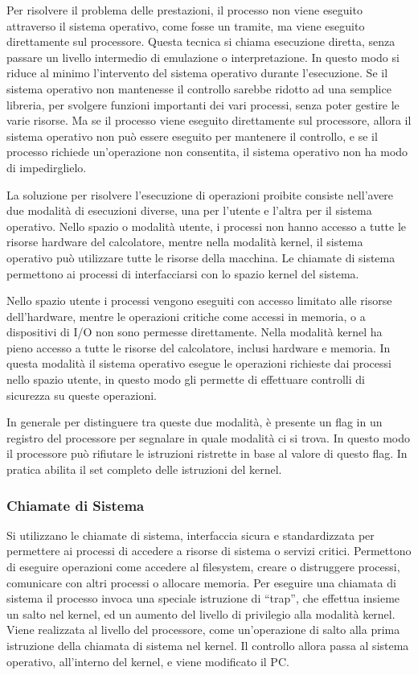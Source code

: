 \documentclass{article}
\numberwithin{equation}{subsection}
\begin{document}
Per risolvere il problema delle prestazioni, il processo non viene eseguito attraverso il sistema operativo, come fosse un tramite, ma viene eseguito direttamente 
sul processore. Questa tecnica si chiama esecuzione diretta, senza passare un livello intermedio di emulazione o interpretazione. In questo modo si riduce al minimo 
l'intervento del sistema operativo durante l'esecuzione. 
Se il sistema operativo non mantenesse il controllo sarebbe ridotto ad una semplice libreria, per svolgere funzioni importanti dei vari processi, senza poter gestire 
le varie risorse. 
Ma se il processo viene eseguito direttamente sul processore, allora il sistema operativo non può essere eseguito per mantenere il controllo, e se il processo 
richiede un'operazione non consentita, il sistema operativo non ha modo di impedirglielo. 

La soluzione per risolvere l'esecuzione di operazioni proibite consiste nell'avere due modalità di esecuzioni diverse, una per l'utente e l'altra per il sistema operativo. 
Nello spazio o modalità utente, i processi non hanno accesso a tutte le risorse hardware del calcolatore, mentre nella modalità kernel, il sistema operativo 
può utilizzare tutte le risorse della macchina. Le chiamate di sistema permettono ai processi di interfacciarsi con lo spazio kernel del sistema. 

Nello spazio utente i processi vengono eseguiti con accesso limitato alle risorse dell'hardware, mentre le operazioni critiche come accessi in memoria, o a dispositivi 
di I/O non sono permesse direttamente. 
Nella modalità kernel ha pieno accesso a tutte le risorse del calcolatore, inclusi hardware e memoria. In questa modalità il sistema operativo esegue le operazioni 
richieste dai processi nello spazio utente, in questo modo gli permette di effettuare controlli di sicurezza su queste operazioni. 


In generale per distinguere tra queste due modalità, è presente un flag in un registro del processore per segnalare in quale modalità ci si trova. In questo modo il 
processore può rifiutare le istruzioni ristrette in base al valore di questo flag. In pratica abilita il set completo delle istruzioni del kernel. 

\subsubsection{Chiamate di Sistema}

Si utilizzano le chiamate di sistema, interfaccia sicura e standardizzata per permettere ai processi di accedere a risorse di sistema o servizi critici. Permettono di 
eseguire operazioni come accedere al filesystem, creare o distruggere processi, comunicare con altri processi o allocare memoria. Per eseguire una chiamata di sistema 
il processo invoca una speciale istruzione di ``trap'', che effettua insieme un salto nel kernel, ed un aumento del livello di privilegio alla modalità kernel. 
Viene realizzata al livello del processore, come un'operazione di salto alla prima istruzione della chiamata di sistema nel kernel. 
Il controllo allora passa al sistema operativo, all'interno del kernel, e viene modificato il PC. 
\end{document}
